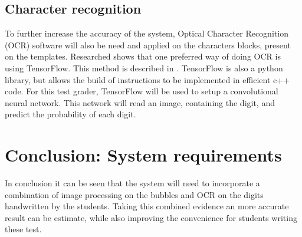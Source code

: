 \subsection{Character recognition}
To further increase the accuracy of the system, Optical Character Recognition (OCR) software will also be need and applied on the characters blocks, present on the templates. Researched shows that one preferred way of doing OCR is using TensorFlow. This method is described in \citet{Tensor}. TensorFlow is also a python library, but allows the build of instructions to be implemented in ef{f}icient c++ code. For this test grader, TensorFlow will be used to setup a convolutional neural network. This network will read an image, containing the digit, and predict the probability of each digit.

\section{Conclusion: System requirements}

In conclusion it can be seen that the system will need to incorporate a combination of image processing on the bubbles and OCR on the digits handwritten by the students. Taking this combined evidence an more accurate result can be estimate, while also improving the convenience for students writing these test.
